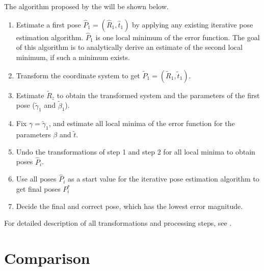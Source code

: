The algorithm proposed by the \cite{robust} will be shown below.
\begin{enumerate}
	\item Estimate a first pose $\hat{P}_1 = (\hat{R}_1, \hat{t}_1)$ by applying any existing iterative pose estimation algorithm. $\hat{P}_1$ is one local minimum of the error function. The goal of this algorithm is to analytically derive an estimate of the second local minimum, if such a minimum exists.
	\item Transform the coordinate system to get $\tilde{P}_1 = (\tilde{R}_1, \tilde{t}_1)$.
	\item Estimate $\tilde{R}_z$ to obtain the transformed system and the parameters of the first pose ($\tilde{\gamma}_1$ and $\tilde{\beta}_1$).
	\item Fix $\gamma = \tilde{\gamma}_1$, and estimate all local minima of the error function for the parameters $\beta$ and $\tilde{t}$.
	\item Undo the transformations of step 1 and step 2 for all local minima to obtain poses $\hat{P}_i$.
	\item Use all poses $\hat{P}_i$ as a start value for the iterative pose estimation algorithm to get final poses $P_i^*$
	\item Decide the final and correct pose, which has the lowest error magnitude.
\end{enumerate}

For detailed description of all transformations and processing steps, see \cite{robust}.

\section{Comparison}


